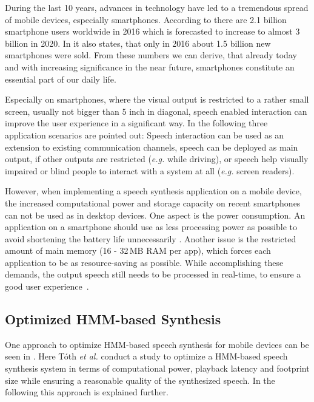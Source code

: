 During the last 10 years, advances in technology have led to a tremendous spread of mobile devices, especially smartphones. According to \cite{statista:smartphones} there are 2.1 billion smartphone users worldwide in 2016 which is forecasted to increase to almost 3 billion in 2020. In \cite{statista:smartphones} it also states, that only in 2016 about 1.5 billion new smartphones were sold. From these numbers we can derive, that already today and with increasing significance in the near future, smartphones constitute an essential part of our daily life.

Especially on smartphones, where the visual output is restricted to a rather small screen, usually not bigger than 5 inch in diagonal, speech enabled interaction can improve the user experience in a significant way. In \cite{toth:optimizing} the following three application scenarios are pointed out: Speech interaction can be used as an extension to existing communication channels, speech can be deployed as main output, if other outputs are restricted (\textit{e.g.} while driving), or speech help visually impaired or blind people to interact with a system at all (\textit{e.g.} screen readers).

However, when implementing a speech synthesis application on a mobile device, the increased computational power and storage capacity on recent smartphones can not be used as in desktop devices. One aspect is the power consumption. An application on a smartphone should use as less processing power as possible to avoid shortening the battery life unnecessarily \cite{toth:optimizing}. Another issue is the restricted amount of main memory (16 - 32\,MB RAM per app), which forces each application to be as resource-saving as possible. While accomplishing these demands, the output speech still needs to be processed in real-time, to ensure a good user experience~\cite{boros:robust}.

\subsection{Optimized \ac{HMM}-based Synthesis}
\label{subsec:hmmembedded}

One approach to optimize \ac{HMM}-based speech synthesis for mobile devices can be seen in \cite{toth:optimizing}. Here T\'oth \textit{et al.} conduct a study to optimize a \ac{HMM}-based speech synthesis system in terms of computational power, playback latency and footprint size while ensuring a reasonable quality of the synthesized speech. In the following this approach is explained further.

